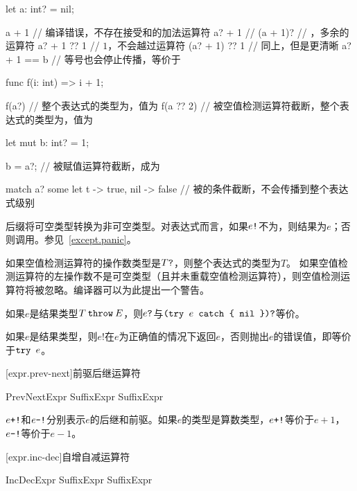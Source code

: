 \enterexample
\begin{codeblock}
let a: int? = nil;

a + 1 // 编译错误，不存在接受和的加法运算符
a? + 1 // 
(a + 1)? // ，多余的运算符
a? + 1 ?? 1 // $1$，不会越过运算符
(a? + 1) ?? 1 // 同上，但是更清晰
a? + 1 == b // 等号也会停止传播，等价于

func f(i: int) => i + 1;

f(a?) // 整个表达式的类型为，值为
f(a ?? 2) // 被空值检测运算符截断，整个表达式的类型为，值为

let mut b: int? = 1;

b = a?; // 被赋值运算符截断，成为

match a? { some let t -> true, nil -> false } // 被的条件截断，不会传播到整个表达式级别
\end{codeblock}
\exitexample

\pnum
后缀\tcode{!}将可空类型转换为非可空类型。对表达式而言，如果$e\texttt{!}$不为，则结果为$e$；否则调用。参见~\ref{except.panic}。

\pnum
如果空值检测运算符的操作数类型是$T\texttt{?}$，则整个表达式的类型为$T$。
如果空值检测运算符的左操作数不是可空类型（且并未重载空值检测运算符），则空值检测运算符将被忽略。编译器可以为此提出一个警告。

\pnum
如果$e$是结果类型$T\mathbin{\texttt{throw}}E$，则$e\texttt{?}$与$\texttt{(try }e\texttt{ catch \{ nil \})?}$等价。

\pnum
如果$e$是结果类型，则$e!$在$e$为正确值的情况下返回$e$，否则抛出$e$的错误值，即等价于$\texttt{try }e$。

[expr.prev-next]{前驱后继运算符}

\begin{bnf}{PrevNextExpr}
    SuffixExpr \terminal{+!} \br
    SuffixExpr \terminal{-!}
\end{bnf}

\pnum
$e\texttt{+!}$和$e\texttt{-!}$分别表示$e$的后继和前驱。如果$e$的类型是算数类型，$e\texttt{+!}$等价于$e+1$，$e\texttt{-!}$等价于$e-1$。

[expr.inc-dec]{自增自减运算符}

\begin{bnf}{IncDecExpr}
    SuffixExpr \terminal{++} \br
    SuffixExpr \terminal{--}
\end{bnf}

